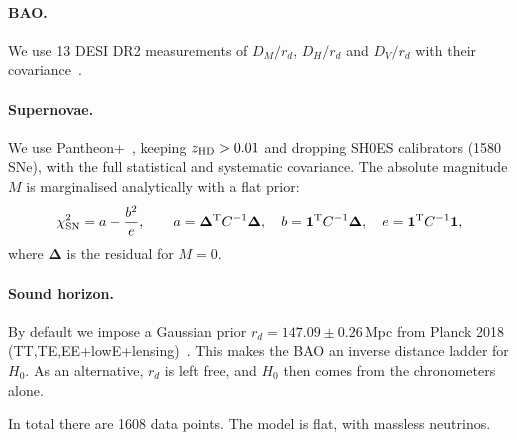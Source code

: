 \documentclass[11pt,a4paper]{article}
\begin{document}
\paragraph{BAO.} We use 13 DESI DR2 measurements of $D_M/r_d$, $D_H/r_d$ and $D_V/r_d$ with their covariance~\cite{2503.14738}.

\paragraph{Supernovae.} We use Pantheon+~\cite{2112.03863,2202.04077}, keeping $z_{\rm HD}>0.01$ and dropping SH0ES calibrators (1580 SNe), with the full statistical and systematic covariance. The absolute magnitude $M$ is marginalised analytically with a flat prior:
\begin{equation}
\chi^2_{\rm SN}=a-\frac{b^2}{e},\qquad a=\bm\Delta^{\rm T}C^{-1}\bm\Delta,\quad b=\bm 1^{\rm T}C^{-1}\bm\Delta,\quad e=\bm1^{\rm T}C^{-1}\bm1 ,
\end{equation}
where $\bm\Delta$ is the residual for $M=0$.

\paragraph{Sound horizon.} By default we impose a Gaussian prior $r_d=147.09\pm0.26$\,Mpc from Planck 2018 (TT,TE,EE+lowE+lensing)~\cite{1807.06209}. This makes the BAO an inverse distance ladder for $H_0$. As an alternative, $r_d$ is left free, and $H_0$ then comes from the chronometers alone.

In total there are 1608 data points. The model is flat, with massless neutrinos.

\end{document}

